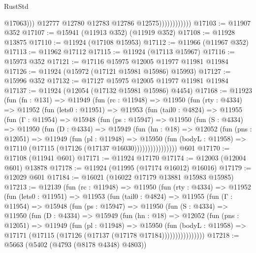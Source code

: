\begin{lexlean}{RustStd}
\begin{coremodule}
{\begin{coremodule}
{{{{{{{{{{{{{{{{{{{{{{{{{{{{{{{{{{{{{{{{{{{{{{{{{{{{{{{{{{{{{{{{{{{{{{{{{{{{{{{{                                  @17063)))
                            @12777
                            @12780
                            @12783
                            @12786
                            @12575))))))))))))
@17103 := @11907 @352
@17107 := @15941 (@11913 @352) (@11919 @352)
@17108 := @11928 @13875
@17110 := @11924 (@17108 @15953)
@17112 := @11966 (@11967 @352)
@17113 := @11962 @17112
@17115 := @11924 (@17113 @15967)
@17116 := @15973 @352
@17121 := @17116 @15975 @12005 @11977 @11981 @11984
@17126 := @11924 (@15972 (@17121 @15981 @15986) @15993)
@17127 := @15996 @352
@17132 := @17127 @15975 @12005 @11977 @11981 @11984
@17137 := @11924 (@12054 (@17132 @15981 @15986) @4454)
@17168 := @11923
    (fun (fn : @131) =>
    @11949
      (fun (rc : @11948) =>
      @11950
        (fun (rty : @4334) =>
        @11952
          (fun (lets0 : @11951) =>
          @11953
            (fun (tail0 : @4824) =>
            @11955
              (fun (Γ : @11954) =>
              @15948
                (fun (ps : @15947) =>
                @11950
                  (fun (S : @4334) =>
                  @11950
                    (fun (D : @4334) =>
                    @15949
                      (fun (hn : @18) =>
                      @12052
                        (fun (pns : @12051) =>
                        @11949
                          (fun (pl : @11948) =>
                          @15950
                            (fun (bodyL : @11958) =>
                            @17110 (@17115 (@17126 (@17137 @16030))))))))))))))))
    @601
@17170 := @17108 (@11941 @601)
@17171 := @11924 @17170
@17174 := @12003 (@12004 @601) @13878
@17178 := @11924 (@11995 (@17174 @16012) @16016)
@17179 := @12029 @601
@17184 := @16021 (@16022 @17179 @13881 @15983 @15985)
@17213 := @12139
    (fun (rc : @11948) =>
    @11950
      (fun (rty : @4334) =>
      @11952
        (fun (lets0 : @11951) =>
        @11953
          (fun (tail0 : @4824) =>
          @11955
            (fun (Γ : @11954) =>
            @15948
              (fun (ps : @15947) =>
              @11950
                (fun (S : @4334) =>
                @11950
                  (fun (D : @4334) =>
                  @15949
                    (fun (hn : @18) =>
                    @12052
                      (fun (pns : @12051) =>
                      @11949
                        (fun (pl : @11948) =>
                        @15950
                          (fun (bodyL : @11958) =>
                          @17171 (@17115 (@17126 (@17137 (@17178 @17184))))))))))))))))
@17218 := @5663 (@5402 (@4793 (@8178 @4348) @4803))
}}}}}}}}}}}}}}}}}}}}}}}}}}}}}}}}}}}}}}}}}}}}}}}}}}}}}}}}}}}}}}}}}}}}}}}}}}}}}}}}
\end{coremodule}}
\end{coremodule}
\end{lexlean}
